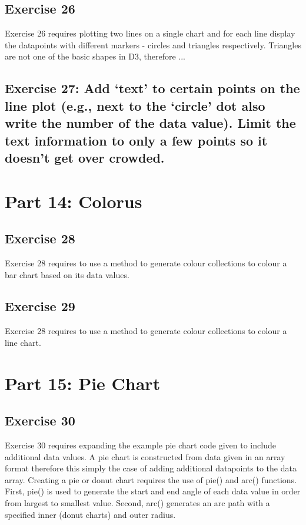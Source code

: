 \documentclass[11pt]{article}   	%
\begin{document}
\subsection{ Exercise 26 }
Exercise 26 requires plotting two lines on a single chart and for each line display the datapoints with different markers - circles and triangles respectively. Triangles are not one of the basic shapes in D3, therefore ...


\subsection{Exercise 27: Add ‘text’ to certain points on the line plot (e.g., next to the ‘circle’ dot also write the number of the data value). Limit the text information to only a few points so it doesn’t get over crowded.}


\section{Part 14: Colorus}
\subsection{ Exercise 28 }
Exercise 28 requires to use a method to generate colour collections to colour a bar chart based on its data values.

\subsection{Exercise 29 }
Exercise 28 requires to use a method to generate colour collections to colour a line chart.


\section{Part 15: Pie Chart }
\subsection{Exercise 30}
Exercise 30 requires expanding the example pie chart code given to include additional data values. A pie chart is constructed from data given in an array format therefore this simply the case of adding additional datapoints to the data array. Creating a pie or donut chart requires the use of pie() and arc() functions. First, pie() is used to generate the start and end angle of each data value in order from largest to smallest value. Second, arc() generates an arc path with a specified inner (donut charts) and outer radius.  
\end{document}
